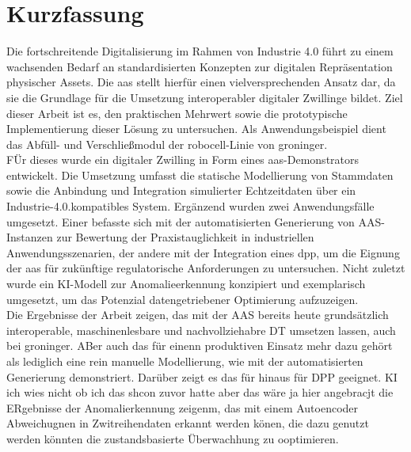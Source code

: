 \newpage
{}
{}
\section*{Kurzfassung}

Die fortschreitende Digitalisierung im Rahmen von Industrie 4.0 führt zu einem wachsenden Bedarf an standardisierten Konzepten zur digitalen Repräsentation physischer Assets. 
Die \ac{aas} stellt hierfür einen vielversprechenden Ansatz dar, da sie die Grundlage für die Umsetzung interoperabler digitaler Zwillinge bildet. 
Ziel dieser Arbeit ist es, den praktischen Mehrwert sowie die prototypische Implementierung dieser Lösung zu untersuchen. 
Als Anwendungsbeispiel dient das Abfüll- und Verschließmodul der robocell-Linie von groninger.\\
FÜr dieses wurde ein digitaler Zwilling in Form eines \acs{aas}-Demonstrators entwickelt.
Die Umsetzung umfasst die statische Modellierung von Stammdaten sowie die Anbindung und Integration simulierter Echtzeitdaten über ein Industrie-4.0.kompatibles System.
Ergänzend wurden zwei Anwendungsfälle umgesetzt. 
Einer befasste sich mit der automatisierten Generierung von AAS-Instanzen zur Bewertung der Praxistauglichkeit in industriellen Anwendungsszenarien, der andere mit der Integration eines \ac{dpp}, um die Eignung der \acs{aas} für zukünftige regulatorische Anforderungen zu untersuchen.
Nicht zuletzt wurde ein KI-Modell zur Anomalieerkennung konzipiert und exemplarisch umgesetzt, um das Potenzial datengetriebener Optimierung aufzuzeigen.\\
Die Ergebnisse der Arbeit zeigen, das mit der AAS bereits heute grundsätzlich interoperable, maschinenlesbare und nachvollziehabre DT umsetzen lassen, auch bei groninger.
ABer auch das für einenn produktiven Einsatz mehr dazu gehört als lediglich eine rein manuelle Modellierung, wie mit der automatisierten Generierung demonstriert.
Darüber zeigt es das für hinaus für DPP geeignet.
KI ich wies nicht ob ich das shcon zuvor hatte aber das wäre ja hier angebracjt die ERgebnisse der Anomalierkennung zeigenm, das mit einem Autoencoder Abweichugnen in Zwitreihendaten erkannt werden könen, die dazu genutzt werden könnten die zustandsbasierte Überwachhung zu ooptimieren.


